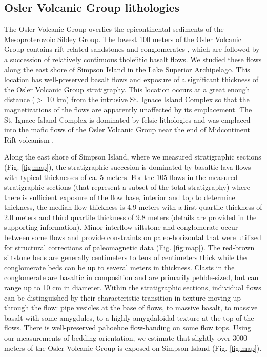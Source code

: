 \documentclass[draft,gc]{AGUTeX}
\begin{document}
\begin{article}
\subsection{Osler Volcanic Group lithologies}
The Osler Volcanic Group overlies the epicontinental sediments of the Mesoproterozoic Sibley Group. The lowest 100 meters of the Osler Volcanic Group contains rift-related sandstones and conglomerates \citep{Hollings2007a}, which are followed by a succession of relatively continuous tholeiitic basalt flows. We studied these flows along the east shore of Simpson Island in the Lake Superior Archipelago. This location has well-preserved basalt flows and exposure of a significant thickness of the Osler Volcanic Group stratigraphy. This location occurs at a great enough distance ($>$ 10 km) from the intrusive St. Ignace Island Complex so that the magnetizations of the flows are apparently unaffected by its emplacement. The St. Ignace Island Complex is dominated by felsic lithologies and was emplaced into the mafic flows of the Osler Volcanic Group near the end of Midcontinent Rift volcanism \citep{Hollings2007b}.

Along the east shore of Simpson Island, where we measured stratigraphic sections (Fig. \ref{fig:map}), the stratigraphic succesion is dominated by basaltic lava flows with typical thicknesses of ca. 5 meters. For the 105 flows in the measured stratigraphic sections (that represent a subset of the total stratigraphy) where there is sufficient exposure of the flow base, interior and top to determine thickness, the median flow thickness is 4.9 meters with a first quartile thickness of 2.0 meters and third quartile thickness of 9.8 meters (details are provided in the supporting information). Minor interflow siltstone and conglomerate occur between some flows and provide constraints on paleo-horizontal that were utilized for structural corrections of paleomagnetic data (Fig. \ref{fig:map}). The red-brown siltstone beds are generally centimeters to tens of centimeters thick while the conglomerate beds can be up to several meters in thickness. Clasts in the conglomerate are basaltic in composition and are primarily pebble-sized, but can range up to 10 cm in diameter. Within the stratigraphic sections, individual flows can be distinguished by their characteristic transition in texture moving up through the flow: pipe vesicles at the base of flows, to massive basalt, to massive basalt with some amygdules, to a highly amygdaloidal texture at the top of the flows. There is well-preserved pahoehoe flow-banding on some flow tops. Using our measurements of bedding orientation, we estimate that slightly over 3000 meters of the Osler Volcanic Group is exposed on Simpson Island (Fig. \ref{fig:map}).


\end{article}
\end{document}
